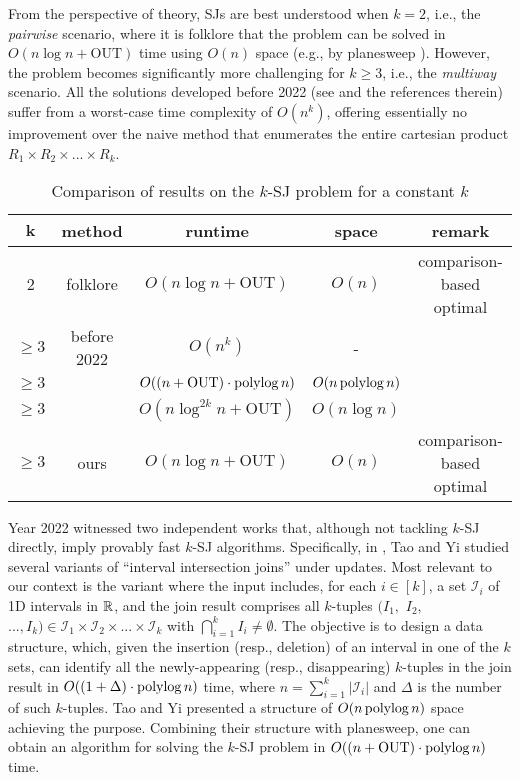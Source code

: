 \documentclass[sigconf]{acmart}
\def\vgap{\vspace{0mm}}
\def\I{\mathcal{I}}
\def\out{\mathrm{OUT}}
\begin{document}
From the perspective of theory, SJs are best understood when $k = 2$, i.e., the {\em pairwise} scenario, where it is folklore that the problem can be solved in $O(n \log n + \out)$ time using $O(n)$ space (e.g., by planesweep \cite{bcko08}). However, the problem becomes significantly more challenging for $k \ge 3$, i.e., the {\em multiway} scenario. All the solutions developed  before 2022 (see \cite{gcn+13,mp98,mp01,pmt99} and the references therein) suffer from a worst-case time complexity of $O(n^k)$, offering essentially no improvement over the naive method that enumerates the entire cartesian product $R_1 \times R_2 \times ... \times R_k$.


\begin{table*} 
    \begin{tabular}{c|c|c|c|c} 
        $\bm{k}$ & {\bf method} & {\bf runtime} & {\bf space} & {\bf remark} \\
        \hline\hline 
        2 & folklore & $O(n \log n + \out)$ & $O(n)$ & comparison-based optimal \\ 
        \hline
        $\ge 3$ & before 2022 & $O(n^k)$ & - & \\
        $\ge 3$ & \cite{ty22} & $O((n + \out) \cdot \polylog n)$ & $O(n \operatorname*{polylog} n)$ & \\
        $\ge 3$ & \cite{kcko22} & $O(n \log^{2k} n + \out)$ & $O(n \log n)$ & \\
        \hline
        $\ge 3$ & ours & $O(n \log n + \out)$ & $O(n)$ & comparison-based optimal
    \end{tabular}
    
    \vspace{3mm}
    \caption{Comparison of results on the $k$-SJ problem for a constant $k$}
    \label{tab:results-com}
\end{table*}

\vgap

Year 2022 witnessed two independent works \cite{ty22,kcko22} that, although not tackling $k$-SJ directly, imply provably fast $k$-SJ algorithms. Specifically, in \cite{ty22}, Tao and Yi studied several variants of ``interval intersection joins'' under updates. Most relevant to our context is the variant where the input includes, for each $i \in [k]$, a set $\I_i$ of 1D intervals in $\mathbb{R}$, and the join result comprises all $k$-tuples $(I_1,$ $I_2,$ $..., I_k) \in \I_1 \times \I_2 \times ... \times \I_k$ with $\bigcap_{i=1}^k I_i \neq \emptyset$. The objective is to design a data structure, which, given the insertion (resp., deletion) of an interval in one of the $k$ sets, can identify all the newly-appearing (resp., disappearing) $k$-tuples in the join result in $O((1+\Delta) \cdot \operatorname*{polylog} n)$ time, where $n = \sum_{i=1}^k |\I_i|$ and $\Delta$ is the number of such $k$-tuples. Tao and Yi \cite{ty22} presented a structure of $O(n \operatorname*{polylog} n)$ space achieving the purpose. Combining their structure with planesweep, one can obtain an algorithm for solving the $k$-SJ problem in $O((n + \out) \cdot \polylog n)$ time.
\end{document}
